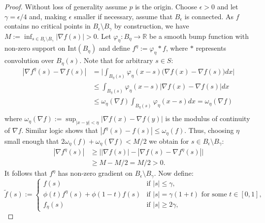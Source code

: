 \documentclass[11pt]{article}
\newcommand{\1}{\mathbf{1}}
\theoremstyle{definition}
\theoremstyle{remark}
\begin{document}
\begin{proof}
    Without loss of generality assume $p$ is the origin. Choose $\epsilon>0$ and let $\gamma=\epsilon/4$ and, making $\epsilon$ smaller if necessary, assume that $B_{\epsilon}$ is connected. As $f$ contains no critical points in $B_{\epsilon}\setminus B_{\gamma}$ by construction, we have $M:=\inf_{s\in B_{\epsilon}\setminus B_{\gamma}} |\nabla f(s)|>0$. Let $\varphi_\eta:B_\eta\rightarrow \mathbb{R}$ be a smooth bump function with non-zero support on $\text{Int}(B_\eta)$ and define $f^\eta:=\varphi_\eta *f$, where $*$ represents convolution over $B_\eta(s)$. Note that for arbitrary $s\in S$:
    \begin{equation}\nonumber 
        \begin{split}
            |\nabla f^\eta(s)-\nabla f(s)| & = \bigg|\int_{B_\eta(s)} \varphi_\eta(x-s)\bigg(\nabla f(x)-\nabla f(s)\bigg)dx\bigg| \\
             & \leq \int_{B_\eta(s)} \varphi_\eta(x-s)\big|\nabla f(x)-\nabla f(s)\big| dx\\
              & \leq \omega_\eta(\nabla f)\int_{B_\eta(s)} \varphi_\eta(x-s) dx=\omega_\eta(\nabla f)\\
        \end{split}
    \end{equation}
    where $\omega_\eta(\nabla f):=\sup_{|x-y|<\eta}|\nabla f(x)-\nabla f(y)|$ is the modulus of continuity of $\nabla f$. Similar logic shows that $|f^\eta(s)-f(s)|\leq \omega_\eta(f)$. Thus, choosing $\eta$ small enough that $2\omega_\eta(f)+\omega_\eta(\nabla f)<M/2$ we obtain for $s \in B_{\epsilon}\setminus B_{\gamma}$:
    \begin{equation}\nonumber
    \begin{split}
        |\nabla f^\eta(s)| & \geq \bigg| |\nabla f(s)| - |\nabla f(s) - \nabla f^\eta(s)|\bigg| \\
        & \geq M-M/2 = M/2 > 0.
    \end{split}
    \end{equation}
    It follows that $f^\eta$ has non-zero gradient on $B_{\epsilon}\setminus B_{\gamma}$. Now define:
    \begin{equation}\nonumber
        \tilde{f}(s):=\begin{cases}
            f(s) & \text{if }|s| \leq\gamma, \\
            \phi(t)f^\eta(s)+\phi(1-t)f(s) & \text{if }|s| = \gamma(1 + t)\text{ for some } t\in[0,1], \\
            f_{\eta}(s) & \text{if }|s|\geq 2\gamma,

\end{cases}
\end{equation}
\end{proof}
\end{document}
